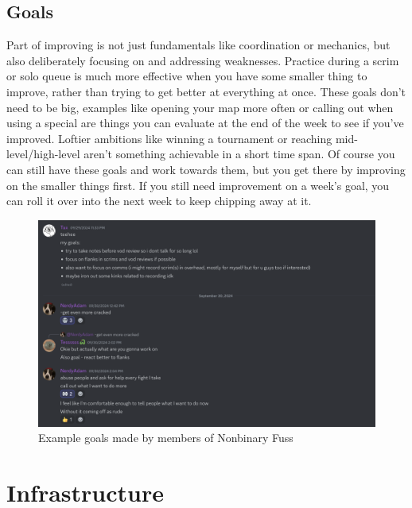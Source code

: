 \documentclass[12pt]{article}
\begin{document}
\subsection{Goals}
Part of improving is not just fundamentals like coordination or mechanics, but also deliberately focusing on and addressing weaknesses. Practice during a scrim or solo queue is much more effective when you have some smaller thing to improve, rather than trying to get better at everything at once. These goals don't need to be big, examples like opening your map more often or calling out when using a special are things you can evaluate at the end of the week to see if you've improved. Loftier ambitions like winning a tournament or reaching mid-level/high-level aren't something achievable in a short time span. Of course you can still have these goals and work towards them, but you get there by improving on the smaller things first. If you still need improvement on a week's goal, you can roll it over into the next week to keep chipping away at it.
\begin{figure}
    \centering
    \includegraphics[width=.95\linewidth]{discord_goals.png}
\caption{Example goals made by members of Nonbinary Fuss}
\end{figure}



\section{Infrastructure}
\end{document}
